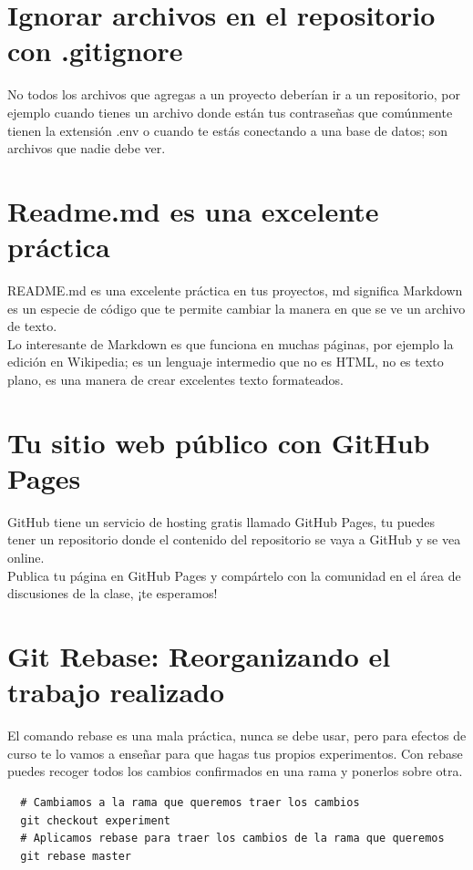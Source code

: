 \documentclass{article}
\begin{document}
\section{Ignorar archivos en el repositorio con .gitignore}%
No todos los archivos que agregas a un proyecto deberían ir a un repositorio,
por ejemplo cuando tienes un archivo donde están tus contraseñas que comúnmente
tienen la extensión .env o cuando te estás conectando a una base de datos; son
archivos que nadie debe ver.\\


\section{Readme.md es una excelente práctica}%
README.md es una excelente práctica en tus proyectos, md significa Markdown es
un especie de código que te permite cambiar la manera en que se ve un archivo
de texto.\\

Lo interesante de Markdown es que funciona en muchas páginas, por ejemplo la
edición en Wikipedia; es un lenguaje intermedio que no es HTML, no es texto
plano, es una manera de crear excelentes texto formateados.


\section{Tu sitio web público con GitHub Pages}%
GitHub tiene un servicio de hosting gratis llamado GitHub Pages, tu puedes
tener un repositorio donde el contenido del repositorio se vaya a GitHub y se
vea online.\\

Publica tu página en GitHub Pages y compártelo con la comunidad en el área de
discusiones de la clase, ¡te esperamos!


\section{Git Rebase: Reorganizando el trabajo realizado}%
El comando rebase es una mala práctica, nunca se debe usar, pero para efectos
de curso te lo vamos a enseñar para que hagas tus propios experimentos. Con
rebase puedes recoger todos los cambios confirmados en una rama y ponerlos
sobre otra.

\begin{verbatim}
  # Cambiamos a la rama que queremos traer los cambios
  git checkout experiment
  # Aplicamos rebase para traer los cambios de la rama que queremos 
  git rebase master
\end{verbatim}
\end{document}
